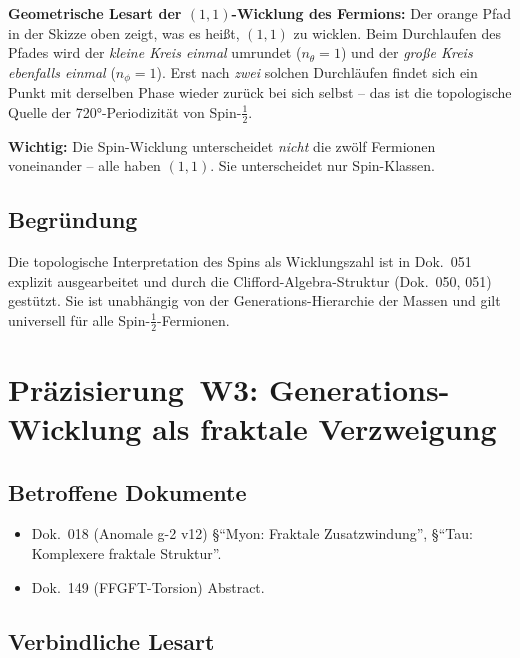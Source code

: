 \textbf{Geometrische Lesart der $(1,1)$-Wicklung des Fermions:}
Der orange Pfad in der Skizze oben zeigt, was es heißt, $(1,1)$ zu
wicklen. Beim Durchlaufen des Pfades wird der \emph{kleine Kreis
einmal} umrundet ($n_\theta = 1$) und der \emph{große Kreis ebenfalls
einmal} ($n_\phi = 1$). Erst nach \emph{zwei} solchen Durchläufen
findet sich ein Punkt mit derselben Phase wieder zurück bei sich
selbst -- das ist die topologische Quelle der 720°-Periodizität von
Spin-$\tfrac12$.

\textbf{Wichtig:} Die Spin-Wicklung unterscheidet \emph{nicht} die
zwölf Fermionen voneinander -- alle haben $(1,1)$. Sie unterscheidet
nur Spin-Klassen.

\subsection*{Begründung}

Die topologische Interpretation des Spins als Wicklungszahl ist in
Dok.~051 explizit ausgearbeitet und durch die Clifford-Algebra-Struktur
(Dok.~050, 051) gestützt. Sie ist unabhängig von der
Generations-Hierarchie der Massen und gilt universell für alle
Spin-$\tfrac12$-Fermionen.

\section{\texorpdfstring{Präzisierung~W3: Generations-Wicklung als fraktale Verzweigung}{Praezisierung W3: Generations-Wicklung als fraktale Verzweigung}}

\subsection*{Betroffene Dokumente}

\begin{itemize}
  \item Dok.~018 (Anomale g-2 v12) §\enquote{Myon: Fraktale
        Zusatzwindung}, §\enquote{Tau: Komplexere fraktale Struktur}.
  \item Dok.~149 (FFGFT-Torsion) Abstract.
\end{itemize}

\subsection*{Verbindliche Lesart}

